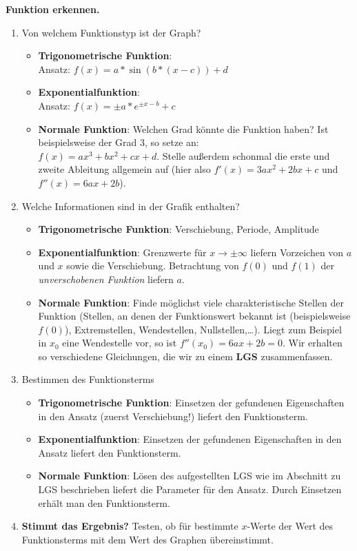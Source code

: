 \begin{koch}
  \textbf{Funktion erkennen.}
  \begin{enumerate}
    \item Von welchem Funktionstyp ist der Graph?
    \begin{itemize}
      \item \textbf{Trigonometrische Funktion}: \\
      Ansatz: $f(x)=a*\sin(b*(x-c))+d$
      \item \textbf{Exponentialfunktion}: \\
      Ansatz: $f(x)=\pm a*e^{\pm x-b}+c$
      \item \textbf{Normale Funktion}: Welchen Grad könnte die Funktion haben? Ist beispielsweise der Grad $3$, so setze an: \\
      $f(x)=ax^3+bx^2+cx+d$. Stelle außerdem schonmal die erste und zweite Ableitung allgemein auf (hier also $f'(x)=3ax^2+2bx+c$ und $f''(x)=6ax+2b$).
    \end{itemize}
    \item Welche Informationen sind in der Grafik enthalten?
    \begin{itemize}
      \item \textbf{Trigonometrische Funktion}: Verschiebung, Periode, Amplitude
      \item \textbf{Exponentialfunktion}: Grenzwerte für $x \rightarrow \pm \infty$ liefern Vorzeichen von $a$ und $x$ sowie die Verschiebung. Betrachtung von $f(0)$ und $f(1)$ der \emph{unverschobenen Funktion} liefern $a$.
      \item \textbf{Normale Funktion}: Finde möglichst viele charakteristische Stellen der Funktion (Stellen, an denen der Funktionswert bekannt ist (beispielsweise $f(0)$), Extremstellen, Wendestellen, Nullstellen,\dots). Liegt zum Beispiel in $x_0$ eine Wendestelle vor, so ist $f''(x_0)=6ax+2b=0$. Wir erhalten so verschiedene Gleichungen, die wir zu einem \textbf{LGS} zusammenfassen.
    \end{itemize}
    \item Bestimmen des Funktionsterms
    \begin{itemize}
      \item \textbf{Trigonometrische Funktion}: Einsetzen der gefundenen Eigenschaften in den Ansatz (zuerst Verschiebung!) liefert den Funktionsterm.
      \item \textbf{Exponentialfunktion}: Einsetzen der gefundenen Eigenschaften in den Ansatz liefert den Funktionsterm.
      \item \textbf{Normale Funktion}: Lösen des aufgestellten LGS wie im Abschnitt zu LGS beschrieben liefert die Parameter für den Ansatz. Durch Einsetzen erhält man den Funktionsterm.
    \end{itemize}
    \item \textbf{Stimmt das Ergebnis?} Testen, ob für bestimmte $x$-Werte der Wert des Funktionsterms mit dem Wert des Graphen übereinstimmt.
  \end{enumerate}
\end{koch}